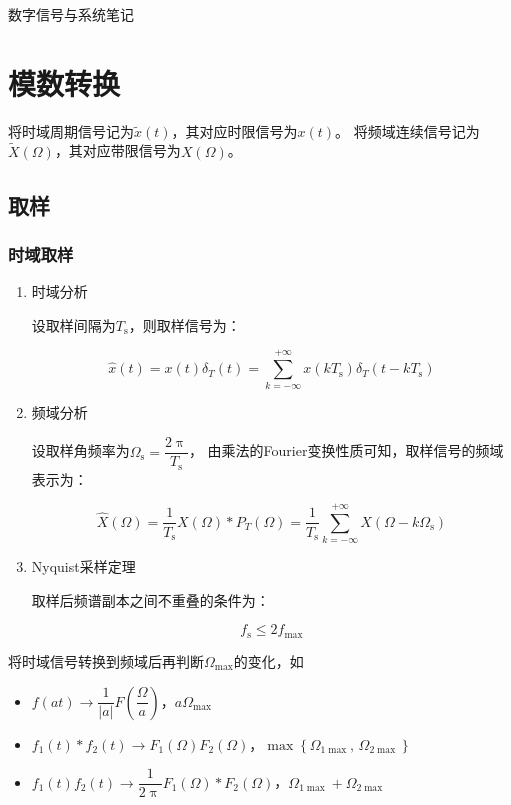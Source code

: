 \documentclass[UTF8,fontset=fandol,zihao=5]{ctexart}
\begin{document}
\begin{center}
  {\heiti\headingfont{}\color{main} 数字信号与系统笔记}
\end{center}

\section{模数转换}

将时域周期信号记为$\tilde{x}(t)$，其对应时限信号为$x(t)$。
将频域连续信号记为$\tilde{X}(\varOmega)$，其对应带限信号为$X(\varOmega)$。

\subsection{取样}

\subsubsection{时域取样}

\begin{enumerate}
  \item 时域分析
  
  设取样间隔为$T_{\mathrm{s}}$，则取样信号为：

  \[
  \hat{x}(t)=x(t)\delta_T(t)=\sum_{k=-\infty}^{+\infty} x(kT_{\mathrm{s}})\delta_T(t-kT_{\mathrm{s}})
  \]

  \item 频域分析
  
  设取样角频率为$\varOmega_{\mathrm{s}}=\dfrac{2\uppi}{T_{\mathrm{s}}}$，
  由乘法的Fourier变换性质可知，取样信号的频域表示为：

  \[
  \hat{X}(\varOmega)=\dfrac{1}{T_{\mathrm{s}}}X(\varOmega)\ast P_T(\varOmega)=\dfrac{1}{T_{\mathrm{s}}}\sum_{k=-\infty}^{+\infty} X(\varOmega-k\varOmega_{\mathrm{s}})
  \]

  \item Nyquist采样定理
  
  取样后频谱副本之间不重叠的条件为：

  \[
  f_{\mathrm{s}} \leq 2f_{\max}
  \]

\end{enumerate}

\begin{methodbox}[【题型】求运算后信号的取样频率]
  
  将时域信号转换到频域后再判断$\varOmega_{\max}$的变化，如
  
  \begin{itemize}
    \item $f(at) \longrightarrow \dfrac{1}{|a|}F\left(\dfrac{\varOmega}{a}\right)$，$a\varOmega_{\max}$
    \item $f_1(t) \ast f_2(t) \longrightarrow F_1(\varOmega)F_2(\varOmega)$，$\max\left\{\varOmega_{1\max},\,\varOmega_{2\max}\right\}$
    \item $f_1(t)f_2(t) \longrightarrow \dfrac{1}{2\uppi} F_1(\varOmega) \ast F_2(\varOmega)$，$\varOmega_{1\max} + \varOmega_{2\max}$
  \end{itemize}
  
\end{methodbox}
\end{document}
